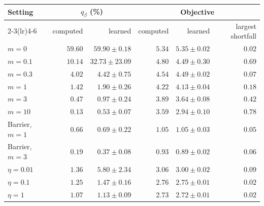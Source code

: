 \begin{tabular}{lrrrrr}
\toprule
Setting & \multicolumn{2}{c}{$q_\beta$ (\%)} & \multicolumn{3}{c}{Objective} \\
\cmidrule(lr){2-3}\cmidrule(lr){4-6}
 & computed & learned & computed & learned & largest shortfall \\
\midrule
$m=0$ & $59.60$ & $59.90\pm0.18$ & $5.34$ & $5.35\pm0.02$ & $0.02$ \\
$m=0.1$ & $10.14$ & $32.73\pm23.09$ & $4.80$ & $4.49\pm0.30$ & $0.69$ \\
$m=0.3$ & $4.02$ & $4.42\pm0.75$ & $4.54$ & $4.49\pm0.02$ & $0.07$ \\
$m=1$ & $1.42$ & $1.90\pm0.26$ & $4.22$ & $4.13\pm0.04$ & $0.18$ \\
$m=3$ & $0.47$ & $0.97\pm0.24$ & $3.89$ & $3.64\pm0.08$ & $0.42$ \\
$m=10$ & $0.13$ & $0.53\pm0.07$ & $3.59$ & $2.94\pm0.10$ & $0.78$ \\
\addlinespace
Barrier, $m=1$ & $0.66$ & $0.69\pm0.22$ & $1.05$ & $1.05\pm0.03$ & $0.05$ \\
Barrier, $m=3$ & $0.19$ & $0.37\pm0.08$ & $0.93$ & $0.89\pm0.02$ & $0.06$ \\
\addlinespace
$\eta=0.01$ & $1.36$ & $5.80\pm2.34$ & $3.06$ & $3.00\pm0.02$ & $0.09$ \\
$\eta=0.1$ & $1.25$ & $1.47\pm0.16$ & $2.76$ & $2.75\pm0.01$ & $0.02$ \\
$\eta=1$ & $1.07$ & $1.13\pm0.09$ & $2.73$ & $2.72\pm0.01$ & $0.02$ \\
\bottomrule
\end{tabular}
